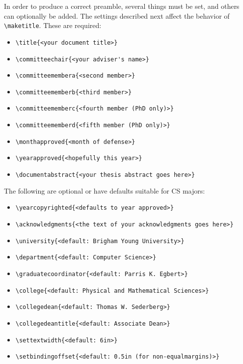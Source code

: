 \documentclass[phd,electronic,twosidetoc,letterpaper,chaptercenter,parttop,lol,lof,lot]{byumsphd}
\begin{document}
In order to produce a correct preamble, several things must be set, and others can optionally be added.  The settings described next affect the behavior of \verb|\maketitle|.  These are required:
\begin{itemize}
    \item \verb|\title{<your document title>}|
    \item \verb|\committeechair{<your adviser's name>}|
    \item \verb|\committeemembera{<second member>}|
    \item \verb|\committeememberb{<third member>}|
    \item \verb|\committeememberc{<fourth member (PhD only)>}|
    \item \verb|\committeememberd{<fifth member (PhD only)>}|
    \item \verb|\monthapproved{<month of defense>}|
    \item \verb|\yearapproved{<hopefully this year>}|
    \item \verb|\documentabstract{<your thesis abstract goes here>}|
\end{itemize}
The following are optional or have defaults suitable for CS majors:
\begin{itemize}
    \item \verb|\yearcopyrighted{<defaults to year approved>}|
    \item \verb|\acknowledgments{<the text of your acknowledgments goes here>}|
    \item \verb|\university{<default: Brigham Young University>}|
    \item \verb|\department{<default: Computer Science>}|
    \item \verb|\graduatecoordinator{<default: Parris K. Egbert>}|
    \item \verb|\college{<default: Physical and Mathematical Sciences>}|
    \item \verb|\collegedean{<default: Thomas W. Sederberg>}|
    \item \verb|\collegedeantitle{<default: Associate Dean>}|
    \item \verb|\settextwidth{<default: 6in>}|
    \item \verb|\setbindingoffset{<default: 0.5in (for non-equalmargins)>}|
\end{itemize}
\end{document}
